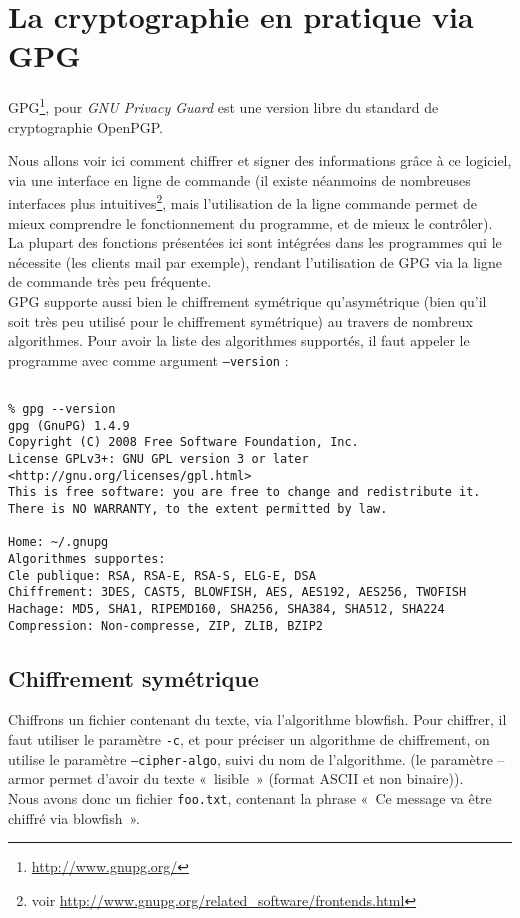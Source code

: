 \chapter{La cryptographie en pratique via GPG}
\thispagestyle{empty}

GPG\footnote{\url{http://www.gnupg.org/}}, pour 
\emph{GNU Privacy Guard} est une version libre du
standard de cryptographie OpenPGP.

Nous allons voir ici comment chiffrer et signer des informations 
grâce à ce
logiciel, via une interface en ligne de commande (il existe
néanmoins de nombreuses interfaces plus intuitives\footnote{voir
\url{http://www.gnupg.org/related_software/frontends.html}}, mais
l'utilisation de la ligne commande permet de mieux comprendre le
fonctionnement du programme, et de mieux le contrôler).
La plupart des fonctions présentées ici sont intégrées dans les
programmes qui le nécessite (les clients mail par exemple), rendant
l'utilisation de GPG via la ligne de commande très peu fréquente.
\\

GPG supporte aussi bien le chiffrement symétrique qu'asymétrique
(bien qu'il soit très peu utilisé pour le chiffrement symétrique)
au travers de nombreux algorithmes. Pour avoir la liste des
algorithmes supportés, il faut appeler le programme avec comme
argument \texttt{--version} : 

\lstset{language=bash}
\begin{lstlisting}

% gpg --version 
gpg (GnuPG) 1.4.9
Copyright (C) 2008 Free Software Foundation, Inc.
License GPLv3+: GNU GPL version 3 or later
<http://gnu.org/licenses/gpl.html>
This is free software: you are free to change and redistribute it.
There is NO WARRANTY, to the extent permitted by law.

Home: ~/.gnupg
Algorithmes supportes:
Cle publique: RSA, RSA-E, RSA-S, ELG-E, DSA
Chiffrement: 3DES, CAST5, BLOWFISH, AES, AES192, AES256, TWOFISH
Hachage: MD5, SHA1, RIPEMD160, SHA256, SHA384, SHA512, SHA224
Compression: Non-compresse, ZIP, ZLIB, BZIP2
\end{lstlisting}

\section{Chiffrement symétrique}
Chiffrons un fichier contenant du texte, via l'algorithme
blowfish. Pour chiffrer, il faut utiliser le paramètre
\texttt{-c}, et pour préciser un algorithme de chiffrement, on
utilise le paramètre \texttt{--cipher-algo}, suivi du nom de
l'algorithme. (le paramètre
--armor permet d'avoir du texte «~lisible~» (format ASCII et non
binaire)).
\\
Nous avons donc un fichier \texttt{foo.txt}, contenant la phrase
«~Ce message va être chiffré via blowfish~».

